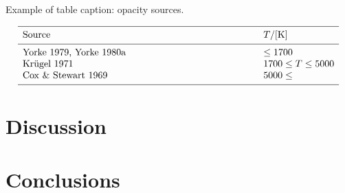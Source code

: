 \documentclass[a4paper,10pt]{article}
\begin{document}
\begin{table}[htb]
      \caption[]{Example of table caption: opacity sources.}
         \label{KapSou}
     $$ 
         \begin{array}{p{0.7\linewidth}l}
            \hline
            \noalign{\smallskip}
            Source      &  T / {[\mathrm{K}]} \\
            \noalign{\smallskip}
            \hline
            \noalign{\smallskip}
            Yorke 1979, Yorke 1980a & \leq 1700           \\
            Kr\"ugel 1971           & 1700 \leq T \leq 5000 \\
            Cox \& Stewart 1969     & 5000 \leq             \\
            \noalign{\smallskip}
            \hline
         \end{array}
     $$ 
\end{table}

\section{Discussion}

\section{Conclusions}





\end{document}
